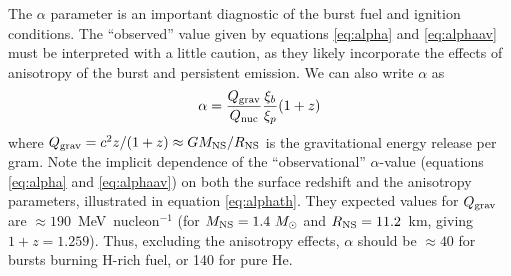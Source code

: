 \documentclass{aastex63}
\begin{document}
The $\alpha$ parameter is an important diagnostic of the burst fuel and ignition conditions.
%
The ``observed'' value given by equations \ref{eq:alpha} and \ref{eq:alphaav} must be interpreted with a little caution, as they likely incorporate the effects of anisotropy of the burst and persistent emission. 
%
We can also write $\alpha$ as
\begin{equation}
\alpha %
 =  \frac{Q_{\rm grav}}{Q_{\rm nuc}}\frac{\xi_b}{\xi_p}(1+z)
 \label{eq:alphath}
\end{equation}
where $Q_{\rm grav} = c^2z/(1+z) \approx GM_{\rm NS}/R_{\rm NS}$ is the gravitational energy release per gram. Note the implicit dependence of the ``observational'' $\alpha$-value (equations \ref{eq:alpha} and \ref{eq:alphaav}) on both the surface redshift and the anisotropy parameters, illustrated in equation \ref{eq:alphath}. 
%
They expected values for $Q_{\rm grav}$ are $\approx190$~MeV~nucleon$^{-1}$ (for $M_{\rm NS}=1.4\ M_\odot$ and $R_{\rm NS}=11.2$~km, giving $1+z=1.259$). Thus, excluding the anisotropy effects, $\alpha$ should be $\approx40$ 
for bursts burning H-rich fuel, or 140 for pure He.
\end{document}
